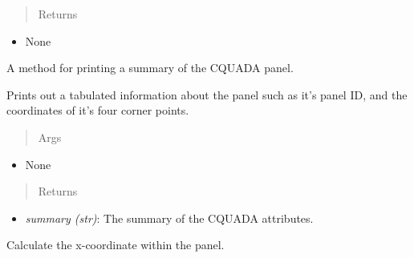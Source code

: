 \documentclass[letterpaper,10pt,english]{sphinxmanual}
\begin{document}
\begin{fulllineitems}
\begin{fulllineitems}
\begin{itemize}
\begin{description}
\end{description}

\end{itemize}
\begin{quote}\begin{description}
\item[{Returns}] \leavevmode
\end{description}\end{quote}
\begin{itemize}
\item {} 
None

\end{itemize}

\end{fulllineitems}


\begin{fulllineitems}
\label{aerodynamics:AeroComBAT.Aerodynamics.CQUADA.printSummary}
A method for printing a summary of the CQUADA panel.

Prints out a tabulated information about the panel such as it's panel
ID, and the coordinates of it's four corner points.
\begin{quote}\begin{description}
\item[{Args}] \leavevmode
\end{description}\end{quote}
\begin{itemize}
\item {} 
None

\end{itemize}
\begin{quote}\begin{description}
\item[{Returns}] \leavevmode
\end{description}\end{quote}
\begin{itemize}
\item {} 
\emph{summary (str)}: The summary of the CQUADA attributes.

\end{itemize}

\end{fulllineitems}


\begin{fulllineitems}
\label{aerodynamics:AeroComBAT.Aerodynamics.CQUADA.x}
Calculate the x-coordinate within the panel.


\end{fulllineitems}
\end{fulllineitems}
\end{document}
